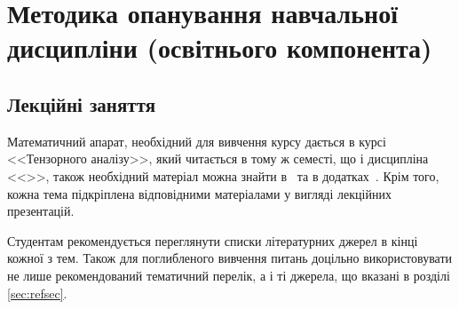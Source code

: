\documentclass{Syllabus}
\begin{document}
\printbibliography[category=LabPract, heading=subbibliography, title={Лабораторний практикум}]



\section{Методика опанування навчальної дисципліни (освітнього компонента)}


\subsection*{Лекційні заняття}

Математичний апарат, необхідний для вивчення курсу дається в курсі <<Тензорного аналізу>>, який читається в тому ж семесті, що і дисципліна <<\discipline>>, також необхідний матеріал можна знайти в~\cite{ParnovskyElectro} та в додатках~\cite{Ponomarenko}. Крім того, кожна тема підкріплена відповідними матеріалами у вигляді лекційних презентацій.

Студентам рекомендується переглянути списки літературних джерел в кінці кожної з тем. Також для поглибленого вивчення питань доцільно використовувати не лише рекомендований тематичний перелік, а і ті джерела, що вказані в розділі \ref{sec:refsec}.
\end{document}
